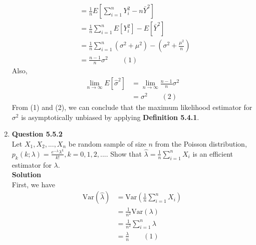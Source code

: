 \documentclass{uofa-eng-assignment}
\begin{document}
\begin{enumerate}
\begin{align*}
                              & = \frac{1}{n} E\left[\sum_{i=1}^{n} Y_i^2 - n \bar{Y}^2\right]                                             \\
                              & = \frac{1}{n} \sum_{i=1}^{n} E\left[Y_i^2\right] - E\left[\bar{Y}^2\right]                                 \\
                              & = \frac{1}{n} \sum_{i=1}^{n} \left(\sigma^2 + \mu^2\right) - \left(\sigma^2 + \frac{\mu^2}{n}\right)       \\
                              & = \frac{n-1}{n}\sigma^2 \qquad (1)
        \end{align*}
        Also,
        \begin{align*}
            \lim_{n \to \infty} E[\hat{\sigma}^2] & = \lim_{n \to \infty} \frac{n-1}{n}\sigma^2 \\
                                                  & = \sigma^2 \qquad (2)
        \end{align*}
        From (1) and (2), we can conclude that the maximum likelihood estimator for $\sigma^2$ is
        asymptotically unbiased by applying \textbf{Definition 5.4.1}.
    \item[]
        \textbf{Question 5.5.2} \\
        Let $X_1, X_2, ..., X_n$ be random sample of size $n$ from the Poisson distribution,
        $p_k(k; \lambda) = \frac{e^{-\lambda} \lambda^k}{k!}, k = 0, 1, 2, ...$. Show that
        $\hat{\lambda} = \frac{1}{n} \sum_{i=1}^{n} X_i$ is an efficient estimator for $\lambda$. \\
        \textbf{Solution} \\
        First, we have
        \begin{align*}
            \text{Var}(\hat{\lambda}) & =  \text{Var}\left(\frac{1}{n} \sum_{i=1}^{n} X_i\right) \\
                                      & = \frac{1}{n^2} \text{Var}(\lambda)                      \\
                                      & = \frac{1}{n^2} \sum_{i=1}^{n} \lambda                   \\
                                      & = \frac{\lambda}{n}                \qquad (1)            \\

\end{align*}
\end{enumerate}
\end{document}
